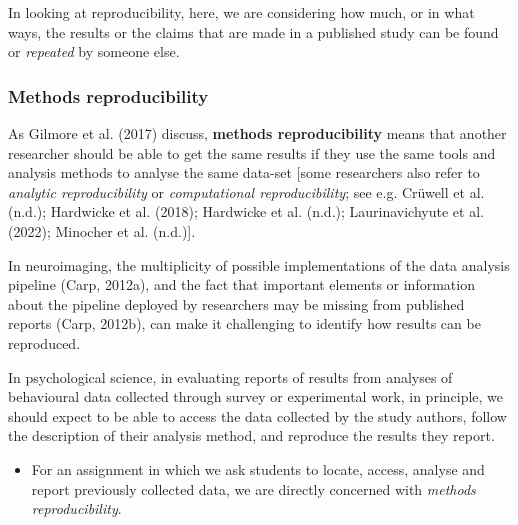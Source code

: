 \documentclass[
  letterpaper,
  DIV=11,
  numbers=noendperiod]{scrreprt}
\providecommand{\tightlist}{%
  \setlength{\itemsep}{0pt}\setlength{\parskip}{0pt}}\usepackage{longtable,booktabs,array}
\begin{document}
In looking at reproducibility, here, we are considering how much, or in
what ways, the results or the claims that are made in a published study
can be found or \emph{repeated} by someone else.

\hypertarget{sec-methodsrepro}{%
\subsubsection{Methods reproducibility}\label{sec-methodsrepro}}

As Gilmore et al. (2017) discuss, \textbf{methods reproducibility} means
that another researcher should be able to get the same results if they
use the same tools and analysis methods to analyse the same data-set
{[}some researchers also refer to \emph{analytic reproducibility} or
\emph{computational reproducibility}; see e.g. Crüwell et al. (n.d.);
Hardwicke et al. (2018); Hardwicke et al. (n.d.); Laurinavichyute et al.
(2022); Minocher et al. (n.d.){]}.

In neuroimaging, the multiplicity of possible implementations of the
data analysis pipeline (Carp, 2012a), and the fact that important
elements or information about the pipeline deployed by researchers may
be missing from published reports (Carp, 2012b), can make it challenging
to identify how results can be reproduced.

In psychological science, in evaluating reports of results from analyses
of behavioural data collected through survey or experimental work, in
principle, we should expect to be able to access the data collected by
the study authors, follow the description of their analysis method, and
reproduce the results they report.

\begin{tcolorbox}[enhanced jigsaw, opacitybacktitle=0.6, title=\textcolor{quarto-callout-tip-color}{\faLightbulb}\hspace{0.5em}{Tip}, arc=.35mm, colbacktitle=quarto-callout-tip-color!10!white, colframe=quarto-callout-tip-color-frame, leftrule=.75mm, opacityback=0, breakable, titlerule=0mm, left=2mm, bottomrule=.15mm, toprule=.15mm, colback=white, coltitle=black, bottomtitle=1mm, toptitle=1mm, rightrule=.15mm]

\begin{itemize}
\tightlist
\item
  For an assignment in which we ask students to locate, access, analyse
  and report previously collected data, we are directly concerned with
  \emph{methods reproducibility}.
\end{itemize}

\end{tcolorbox}
\end{document}
